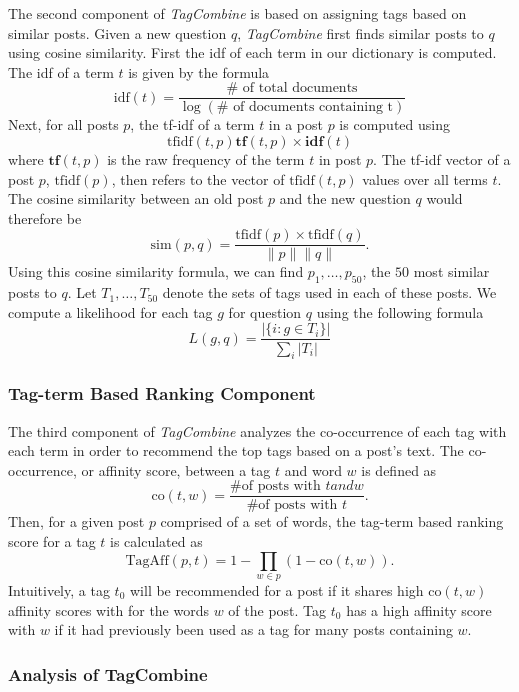 \documentclass[11pt]{IEEEtran}
\begin{document}
The second component of \textit{TagCombine} is based on assigning tags based on similar posts. Given a new question $q$, \textit{TagCombine} first finds similar posts to $q$ using cosine similarity. First the idf of each term in our dictionary is computed. The idf of a term $t$ is given by the formula
\[ \text{idf}(t) = \frac{\# \text{ of total documents}}{\log (\# \text{ of documents containing t} )} \]
Next, for all posts $p$, the tf-idf of a term $t$ in a post $p$ is computed using
\[ \text{tfidf}(t,p) \mathbf{tf}(t, p) \times \mathbf{idf}(t)\]
where $\mathbf{tf}(t, p)$ is the raw frequency of the term $t$ in post $p$. The tf-idf vector of a post $p$, $\text{tfidf}(p)$, then refers to the vector of $\text{tfidf}(t,p)$ values over all terms $t$. The cosine similarity between an old post $p$ and the new question $q$ would therefore be
\[ \text{sim}(p, q) = \frac{\text{tfidf}(p) \times \text{tfidf}(q)}{\|p\| \|q\|}.\]
Using this cosine similarity formula, we can find $p_1, \ldots, p_{50}$, the $50$ most similar posts to $q$. Let $T_1, \ldots, T_{50}$ denote the sets of tags used in each of these posts. We compute a likelihood for each tag $g$ for question $q$ using the following formula
\[ L(g, q) = \frac{ |\{i : g \in T_i \} | }{\sum_i  |T_i |}\]


\subsubsection{Tag-term Based Ranking Component}

The third component of \textit{TagCombine} analyzes the co-occurrence of each tag with each term in order to recommend the top tags based on a post’s text. The co-occurrence, or affinity score, between a tag $t$ and word $w$ is defined as
\[ \text{co}(t, w) = \frac{\text{\# of posts with }t{ and }w}{\text{\# of posts with }t}. \]
Then, for a given post $p$ comprised of a set of words, the tag-term based ranking score for a tag $t$ is calculated as
\[ \text{TagAff}(p, t) = 1 - \prod_{w \in p}(1 - \text{co}(t, w)). \]
Intuitively, a tag $t_0$ will be recommended for a post if it shares high $\text{co}(t, w)$ affinity scores with for the words $w$ of the post. Tag $t_0$ has a high affinity score with $w$ if it had previously been used as a tag for many posts containing $w$.


\subsubsection{Analysis of TagCombine}
\end{document}
